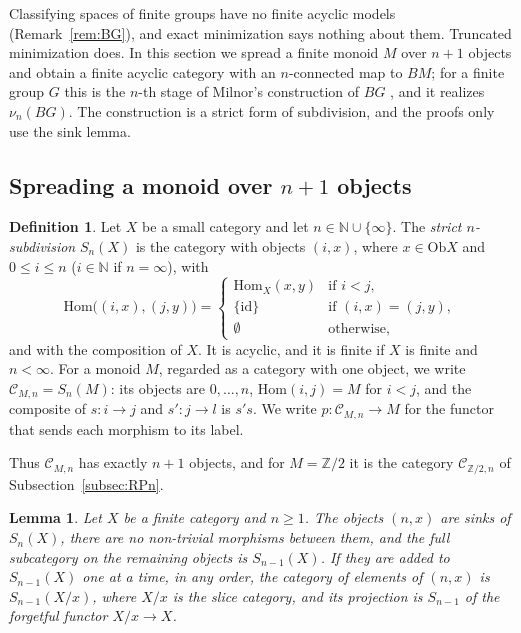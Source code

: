 \documentclass[12pt]{amsart}
\newtheorem{lemma}[teo]{Lemma}
\theoremstyle{definition}
\newtheorem{definition}[teo]{Definition}
\theoremstyle{remark}
\newcommand{\CC}{\mathcal{C}}
\newcommand{\co}{\colon}
\newcommand{\id}{\mathrm{id}}
\newcommand{\Hom}{\mathrm{Hom}}
\newcommand{\Ob}{\mathrm{Ob}}
\newcommand{\Z}{\mathbb{Z}}
\begin{document}
Classifying spaces of finite groups have no finite acyclic models (Remark~\ref{rem:BG}), and exact minimization says nothing about them. Truncated minimization does. In this section we spread a finite monoid $M$ over $n+1$ objects and obtain a finite acyclic category with an $n$-connected map to $BM$; for a finite group $G$ this is the $n$-th stage of Milnor's construction of $BG$ \cite{Milnor1956}, and it realizes $\nu_n(BG)$. The construction is a strict form of subdivision, and the proofs only use the sink lemma.

\subsection{Spreading a monoid over \texorpdfstring{$n+1$}{n+1} objects}\label{subsec:spreading}

\begin{definition}\label{def:CMn}
Let $X$ be a small category and let $n\in\mathbb N\cup\{\infty\}$. The \emph{strict $n$-subdivision} $S_n(X)$ is the category with objects $(i,x)$, where $x\in\Ob X$ and $0\le i\le n$ ($i\in\mathbb N$ if $n=\infty$), with
\[
\Hom\bigl((i,x),(j,y)\bigr)=
\begin{cases}
\Hom_X(x,y) & \text{if } i<j,\\
\{\id\} & \text{if } (i,x)=(j,y),\\
\emptyset & \text{otherwise},
\end{cases}
\]
and with the composition of $X$. It is acyclic, and it is finite if $X$ is finite and $n<\infty$. For a monoid $M$, regarded as a category with one object, we write $\CC_{M,n}=S_n(M)$: its objects are $0,\dots,n$, $\Hom(i,j)=M$ for $i<j$, and the composite of $s\co i\to j$ and $s'\co j\to l$ is $s's$. We write $p\co\CC_{M,n}\to M$ for the functor that sends each morphism to its label.
\end{definition}

Thus $\CC_{M,n}$ has exactly $n+1$ objects, and for $M=\Z/2$ it is the category $\CC_{\Z/2,n}$ of Subsection~\ref{subsec:RPn}.

\begin{lemma}\label{lem:Sn-sinks}
Let $X$ be a finite category and $n\ge1$. The objects $(n,x)$ are sinks of $S_n(X)$, there are no non-trivial morphisms between them, and the full subcategory on the remaining objects is $S_{n-1}(X)$. If they are added to $S_{n-1}(X)$ one at a time, in any order, the category of elements of $(n,x)$ is $S_{n-1}(X/x)$, where $X/x$ is the slice category, and its projection is $S_{n-1}$ of the forgetful functor $X/x\to X$.
\end{lemma}
\end{document}
